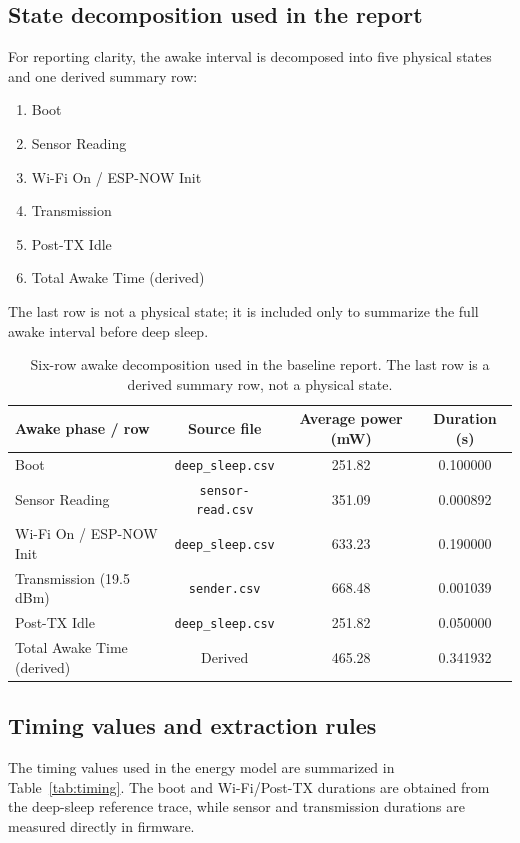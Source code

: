 \documentclass[11pt,a4paper]{article}
\begin{document}
\subsection{State decomposition used in the report}
For reporting clarity, the awake interval is decomposed into five physical states and one derived summary row:
\begin{enumerate}[leftmargin=1.5em]
\item Boot
\item Sensor Reading
\item Wi-Fi On / ESP-NOW Init
\item Transmission
\item Post-TX Idle
\item Total Awake Time (derived)
\end{enumerate}
The last row is not a physical state; it is included only to summarize the full awake interval before deep sleep.

\begin{table}[H]
\centering
\caption{Six-row awake decomposition used in the baseline report. The last row is a derived summary row, not a physical state.}
\begin{tabular}{lccc}
\toprule
Awake phase / row & Source file & Average power (mW) & Duration (s) \\
\midrule
Boot & \texttt{deep\_sleep.csv} & 251.82 & 0.100000 \\
Sensor Reading & \texttt{sensor-read.csv} & 351.09 & 0.000892 \\
Wi-Fi On / ESP-NOW Init & \texttt{deep\_sleep.csv} & 633.23 & 0.190000 \\
Transmission (19.5 dBm) & \texttt{sender.csv} & 668.48 & 0.001039 \\
Post-TX Idle & \texttt{deep\_sleep.csv} & 251.82 & 0.050000 \\
\midrule
Total Awake Time (derived) & Derived & 465.28 & 0.341932 \\
\bottomrule
\end{tabular}
\end{table}

\subsection{Timing values and extraction rules}
The timing values used in the energy model are summarized in Table~\ref{tab:timing}. The boot and Wi-Fi/Post-TX durations are obtained from the deep-sleep reference trace, while sensor and transmission durations are measured directly in firmware.
\end{document}
